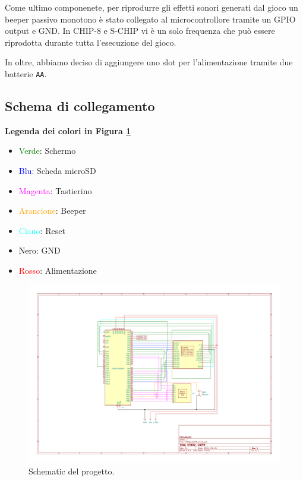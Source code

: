 \documentclass[a4paper]{article}
\begin{document}
Come ultimo componenete, per riprodurre gli effetti sonori generati dal gioco
un beeper passivo monotono è stato collegato al microcontrollore tramite un
GPIO output e GND. In CHIP-8 e S-CHIP vi è un solo frequenza che può
essere riprodotta durante tutta l'esecuzione del gioco.

In oltre, abbiamo deciso di aggiungere uno slot per l'alimentazione tramite
due batterie \texttt{AA}.

\subsection{Schema di collegamento}

\textbf{Legenda dei colori in Figura \ref{fig:schematic}}

\begin{itemize}
    \item \textcolor{green}{Verde}: Schermo
    \item \textcolor{blue}{Blu}: Scheda microSD
    \item \textcolor{magenta}{Magenta}: Tastierino
    \item \textcolor{orange}{Arancione}: Beeper
    \item \textcolor{cyan}{Ciano}: Reset
    \item \textcolor{black}{Nero}: GND
    \item \textcolor{red}{Rosso}: Alimentazione
\end{itemize}

\begin{figure}[h!t]
    \begin{center}
        \includegraphics[scale=0.50]{figures/STM32_CHIP8.pdf}
    \end{center}
    \caption{
        Schematic del progetto.
    }
    \label{fig:schematic}
\end{figure}
\end{document}
